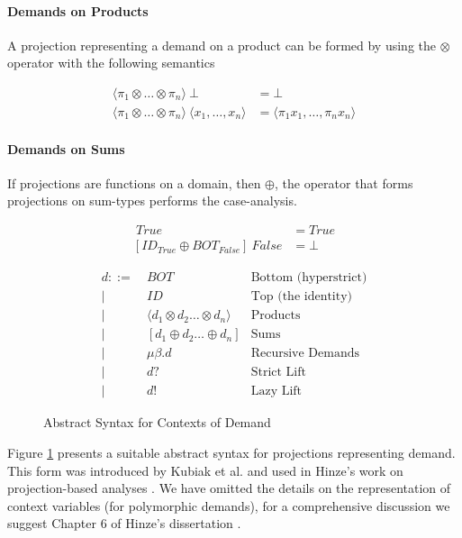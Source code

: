 \paragraph{Demands on Products} A projection representing a demand on a product
can be formed by using the $\otimes$ operator with the following semantics

\begin{align*}
\langle \pi_{1} \otimes \dots \otimes \pi_{n} \rangle \ \bot &= \bot \\
\langle \pi_{1} \otimes \dots \otimes \pi_{n} \rangle \ 
\langle x_{1}, \dots, x_{n} \rangle &= \langle \pi_{1} x_{1}, \dots, \pi_{n} x_{n} \rangle
\end{align*}

\paragraph{Demands on Sums} If projections are functions on a domain, then
$\oplus$, the operator that forms projections on sum-types performs the case-analysis.

\begin{align*}
[ID_{True} \oplus ID_{False}]  \ True &= True \\
[ID_{True} \oplus BOT_{False}] \ False &= \bot
\end{align*}

\begin{figure}
\begin{align*}
    d ::=&\ BOT              & \text{Bottom (hyperstrict)} \\
        |&\ ID               & \text{Top (the identity)} \\
        |&\ \langle d_{1} \otimes d_{2} \dots \otimes d_{n} \rangle   & \text{Products} \\ 
        |&\ [d_{1} \oplus d_{2} \dots \oplus d_{n}]    & \text{Sums} \\ 
        |&\ \mu\beta . d     & \text{Recursive Demands} \\
        |&\ d?               & \text{Strict Lift} \\
        |&\ d!               & \text{Lazy Lift}
\end{align*}
\caption{Abstract Syntax for Contexts of Demand}
\label{fig:ContextAST}
\end{figure}


Figure \ref{fig:ContextAST} presents a suitable abstract syntax for projections
representing demand.  This form was introduced by Kubiak et al. and used in
Hinze's work on projection-based analyses \citep{kubiak, hinze1995projection}.
We have omitted the details on the representation of context variables (for
polymorphic demands), for a comprehensive discussion we suggest Chapter 6 of Hinze's
dissertation \citep{hinze1995projection}.

